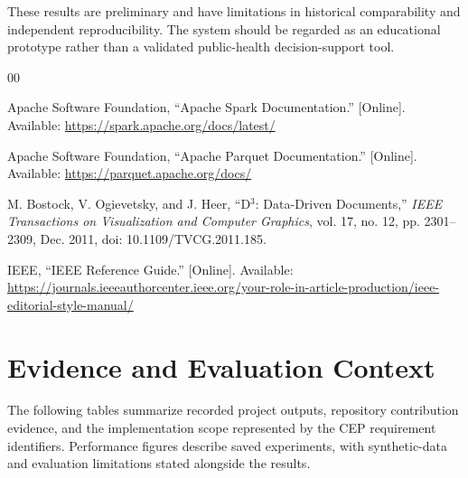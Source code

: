 \documentclass[conference]{IEEEtran}
\begin{document}
These results are preliminary and have limitations in historical comparability and independent reproducibility. The system should be regarded as an educational prototype rather than a validated public-health decision-support tool.

\begin{thebibliography}{00}

Apache Software Foundation, ``Apache Spark Documentation.''
[Online]. Available: \url{https://spark.apache.org/docs/latest/}

Apache Software Foundation, ``Apache Parquet Documentation.''
[Online]. Available: \url{https://parquet.apache.org/docs/}

M. Bostock, V. Ogievetsky, and J. Heer, ``D$^3$: Data-Driven Documents,''
\emph{IEEE Transactions on Visualization and Computer Graphics},
vol. 17, no. 12, pp. 2301--2309, Dec. 2011,
doi: 10.1109/TVCG.2011.185.

IEEE, ``IEEE Reference Guide.'' [Online]. Available:
\url{https://journals.ieeeauthorcenter.ieee.org/your-role-in-article-production/ieee-editorial-style-manual/}

\end{thebibliography}

\clearpage
\onecolumn

\section*{Evidence and Evaluation Context}
The following tables summarize recorded project outputs, repository contribution evidence, and the implementation scope represented by the CEP requirement identifiers. Performance figures describe saved experiments, with synthetic-data and evaluation limitations stated alongside the results.
\end{document}
